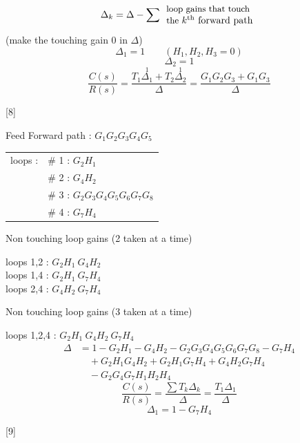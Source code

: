 \documentclass[11pt,a4paper]{article}
\begin{document}
\[ \Delta_k = \Delta - \sum \begin{array}{l}\text{\small loop gains that touch}\\ \text{\small the } k^{\text{th}} \text{ forward path}\end{array} \]
\noindent \hspace*{3em}(make the touching gain 0 in $\Delta$)
\[ \Delta_1 = 1 \qquad (H_1,H_2,H_3=0) \]
\[ \Delta_2 = 1 \]
\[ \frac{C(s)}{R(s)} = \frac{T_1\overset{1}{\Delta_1} + T_2\overset{1}{\Delta_2}}{\Delta} = \frac{G_1G_2G_3 + G_1G_3}{\Delta} \]

[8]

\noindent Feed Forward path : $G_1 G_2 G_3 G_4 G_5$

\medskip
\noindent
\begin{tabular}[t]{@{}l@{\ \ }l@{}}
loops : & \# 1 : $G_2H_1$\\
 & \# 2 : $G_4H_2$\\
 & \# 3 : $G_2G_3G_4G_5G_6G_7G_8$\\
 & \# 4 : $G_7H_4$
\end{tabular}


\noindent Non touching loop gains (2 taken at a time)

\noindent loops 1,2 : $G_2H_1\ G_4H_2$\\
loops 1,4 : $G_2H_1\ G_7H_4$\\
loops 2,4 : $G_4H_2\ G_7H_4$

\bigskip
\noindent Non touching loop gains (3 taken at a time)

\noindent loops 1,2,4 : $G_2H_1\ G_4H_2\ G_7H_4$
\[ \begin{aligned}
\Delta &= 1 - G_2H_1 - G_4H_2 - G_2G_3G_4G_5G_6G_7G_8 - G_7H_4 \\
&\quad + G_2H_1G_4H_2 + G_2H_1G_7H_4 + G_4H_2G_7H_4 \\
&\quad - G_2G_4G_7H_1H_2H_4
\end{aligned} \]
\[ \frac{C(s)}{R(s)} = \frac{\sum T_k\Delta_k}{\Delta} = \frac{T_1\Delta_1}{\Delta} \]
\[ \Delta_1 = 1 - G_7H_4 \]

[9]
\end{document}
